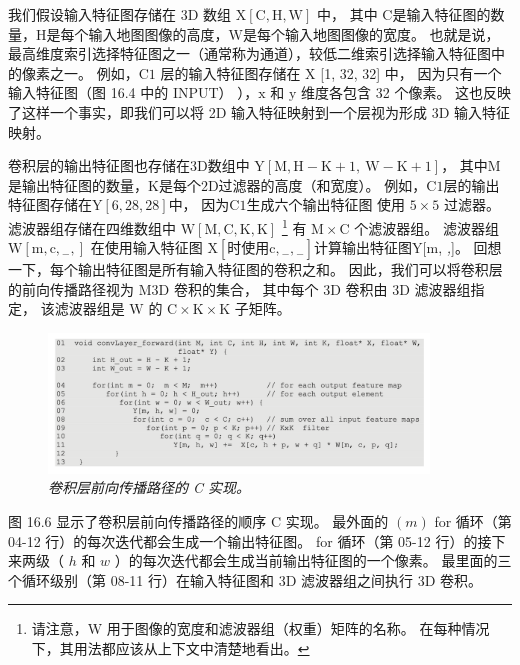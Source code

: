 我们假设输入特征图存储在 $3 \mathrm{D}$ 数组 $\mathrm{X}[\mathrm{C}, \mathrm{H}, \mathrm{W}]$ 中，
其中 $\mathrm {C}$是输入特征图的数量，$\mathrm{H}$是每个输入地图图像的高度，$\mathrm{W}$是每个输入地图图像的宽度。 
也就是说，最高维度索引选择特征图之一（通常称为通道），较低二维索引选择输入特征图中的像素之一。 
例如，$\mathrm{C} 1$ 层的输入特征图存储在 $\mathrm{X}$ [1, 32, 32] 中，
因为只有一个输入特征图（图 16.4 中的 INPUT） ），$\mathrm{x}$ 和 $\mathrm{y}$ 维度各包含 32 个像素。 
这也反映了这样一个事实，即我们可以将 2D 输入特征映射到一个层视为形成 3D 输入特征映射。

卷积层的输出特征图也存储在3D数组中 $\mathrm{Y}[\mathrm{M}, \mathrm{H}-\mathrm{K}+1, \mathrm{~W}-\mathrm{K}+1]$，
其中$\mathrm{M}$是输出特征图的数量，$\mathrm{K}$是每个$2\mathrm{D}$过滤器的高度（和宽度）。 
例如，$\mathrm{C} 1$层的输出特征图存储在$\mathrm{Y}[6,28,28]$中，
因为$\mathrm{C} 1$生成六个输出特征图 使用 $5 \times 5$ 过滤器。 
滤波器组存储在四维数组中 $\mathrm{W}[\mathrm{M}, \mathrm{C}, \mathrm{K}, \mathrm{K}]$
\footnote{请注意，W 用于图像的宽度和滤波器组（权重）矩阵的名称。 在每种情况下，其用法都应该从上下文中清楚地看出。} 
有 $\mathrm{M} \times \mathrm{C}$ 个滤波器组。 
滤波器组 $\mathrm{W}\left[\mathrm{m}, \mathrm{c},{ }_{-},\right]$
在使用输入特征图 $\mathrm{X}\left[ 时使用 \mathrm{c},{ }_{-},{ }_{-}\right]$计算输出特征图$\mathrm{Y}[\mathrm{m}$, \textit{,}]。 
回想一下，每个输出特征图是所有输入特征图的卷积之和。 
因此，我们可以将卷积层的前向传播路径视为 $\mathrm{M} 3 \mathrm{D}$ 卷积的集合，
其中每个 3D 卷积由 $3 \mathrm{D}$ 滤波器组指定，
该滤波器组是 $\mathrm{W}$ 的 $\mathrm{C} \times \mathrm{K} \times \mathrm{K}$ 子矩阵。

\begin{figure}[H]
	\centering
	\includegraphics[width=0.9\textwidth]{figs/F16.6.png}
	\caption{\textit{卷积层前向传播路径的 C 实现。}}
\end{figure}

图 16.6 显示了卷积层前向传播路径的顺序 $\mathrm{C}$ 实现。 
最外面的 $(m)$ for 循环（第 04-12 行）的每次迭代都会生成一个输出特征图。 
for 循环（第 05-12 行）的接下来两级（ $h$ 和 $w$ ）的每次迭代都会生成当前输出特征图的一个像素。 
最里面的三个循环级别（第 08-11 行）在输入特征图和 3D 滤波器组之间执行 3D 卷积。

